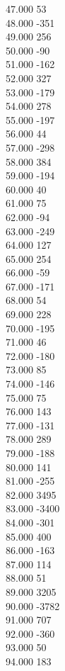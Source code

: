 { 47.000	53 \\
 48.000	-351 \\
 49.000	256 \\
 50.000	-90 \\
 51.000	-162 \\
 52.000	327 \\
 53.000	-179 \\
 54.000	278 \\
 55.000	-197 \\
 56.000	44 \\
 57.000	-298 \\
 58.000	384 \\
 59.000	-194 \\
 60.000	40 \\
 61.000	75 \\
 62.000	-94 \\
 63.000	-249 \\
 64.000	127 \\
 65.000	254 \\
 66.000	-59 \\
 67.000	-171 \\
 68.000	54 \\
 69.000	228 \\
 70.000	-195 \\
 71.000	46 \\
 72.000	-180 \\
 73.000	85 \\
 74.000	-146 \\
 75.000	75 \\
 76.000	143 \\
 77.000	-131 \\
 78.000	289 \\
 79.000	-188 \\
 80.000	141 \\
 81.000	-255 \\
 82.000	3495 \\
 83.000	-3400 \\
 84.000	-301 \\
 85.000	400 \\
 86.000	-163 \\
 87.000	114 \\
 88.000	51 \\
 89.000	3205 \\
 90.000	-3782 \\
 91.000	707 \\
 92.000	-360 \\
 93.000	50 \\
 94.000	183 \\
}
